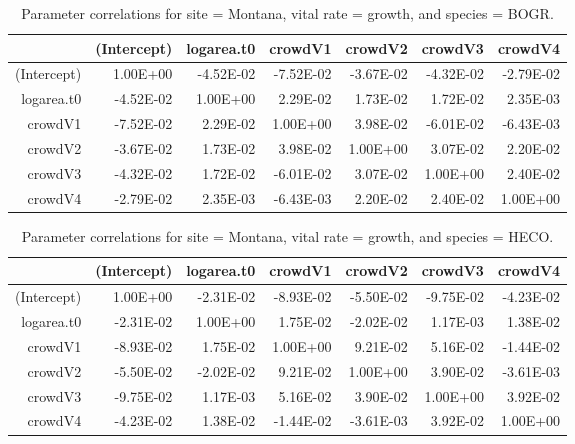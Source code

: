 \documentclass[12pt,]{article}
\begin{document}
\begin{table}[ht]
\centering
\caption{Parameter correlations for site = Montana, vital rate = growth, and species = BOGR.} 
\begin{tabular}{rrrrrrr}
  \hline
 & (Intercept) & logarea.t0 & crowdV1 & crowdV2 & crowdV3 & crowdV4 \\ 
  \hline
(Intercept) & 1.00E+00 & -4.52E-02 & -7.52E-02 & -3.67E-02 & -4.32E-02 & -2.79E-02 \\ 
  logarea.t0 & -4.52E-02 & 1.00E+00 & 2.29E-02 & 1.73E-02 & 1.72E-02 & 2.35E-03 \\ 
  crowdV1 & -7.52E-02 & 2.29E-02 & 1.00E+00 & 3.98E-02 & -6.01E-02 & -6.43E-03 \\ 
  crowdV2 & -3.67E-02 & 1.73E-02 & 3.98E-02 & 1.00E+00 & 3.07E-02 & 2.20E-02 \\ 
  crowdV3 & -4.32E-02 & 1.72E-02 & -6.01E-02 & 3.07E-02 & 1.00E+00 & 2.40E-02 \\ 
  crowdV4 & -2.79E-02 & 2.35E-03 & -6.43E-03 & 2.20E-02 & 2.40E-02 & 1.00E+00 \\ 
   \hline
\end{tabular}
\end{table}

\begin{table}[ht]
\centering
\caption{Parameter correlations for site = Montana, vital rate = growth, and species = HECO.} 
\begin{tabular}{rrrrrrr}
  \hline
 & (Intercept) & logarea.t0 & crowdV1 & crowdV2 & crowdV3 & crowdV4 \\ 
  \hline
(Intercept) & 1.00E+00 & -2.31E-02 & -8.93E-02 & -5.50E-02 & -9.75E-02 & -4.23E-02 \\ 
  logarea.t0 & -2.31E-02 & 1.00E+00 & 1.75E-02 & -2.02E-02 & 1.17E-03 & 1.38E-02 \\ 
  crowdV1 & -8.93E-02 & 1.75E-02 & 1.00E+00 & 9.21E-02 & 5.16E-02 & -1.44E-02 \\ 
  crowdV2 & -5.50E-02 & -2.02E-02 & 9.21E-02 & 1.00E+00 & 3.90E-02 & -3.61E-03 \\ 
  crowdV3 & -9.75E-02 & 1.17E-03 & 5.16E-02 & 3.90E-02 & 1.00E+00 & 3.92E-02 \\ 
  crowdV4 & -4.23E-02 & 1.38E-02 & -1.44E-02 & -3.61E-03 & 3.92E-02 & 1.00E+00 \\ 
   \hline
\end{tabular}
\end{table}
\end{document}
